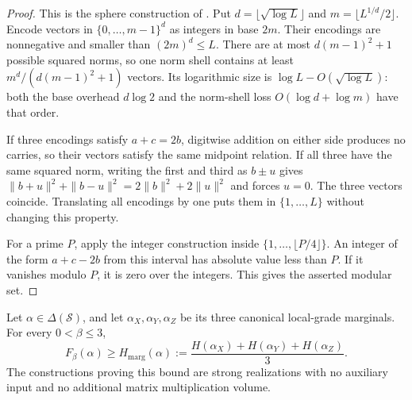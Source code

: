 \begin{proof}
This is the sphere construction of \citet{behrend}.  Put
$d=\lfloor\sqrt{\log L}\rfloor$ and
$m=\lfloor L^{1/d}/2\rfloor$.  Encode vectors in
$\{0,\ldots,m-1\}^d$ as integers in base $2m$.  Their encodings are
nonnegative and smaller than $(2m)^d\le L$.  There are at most
$d(m-1)^2+1$ possible squared norms, so one norm shell contains at least
$m^d/(d(m-1)^2+1)$ vectors.  Its logarithmic size is
$\log L-O(\sqrt{\log L})$: both the base overhead $d\log2$ and the
norm-shell loss $O(\log d+\log m)$ have that order.

If three encodings satisfy $a+c=2b$, digitwise addition on either side
produces no carries, so their vectors satisfy the same midpoint relation.
If all three have the same squared norm, writing the first and third as
$b\pm u$ gives $\|b+u\|^2+\|b-u\|^2=2\|b\|^2+2\|u\|^2$ and forces
$u=0$.  The three vectors coincide.  Translating all encodings by one puts
them in $\{1,\ldots,L\}$ without changing this property.

For a prime $P$, apply the integer construction inside
$\{1,\ldots,\lfloor P/4\rfloor\}$.  An integer of the form $a+c-2b$
from this interval has absolute value less than $P$.  If it vanishes modulo
$P$, it is zero over the integers.  This gives the asserted modular set.
\end{proof}

\begin{proposition}
\label{prop:matching}
Let $\alpha\in\Delta(\mathcal S)$, and let
$\alpha_X,\alpha_Y,\alpha_Z$ be its three canonical local-grade marginals.
For every $0<\beta\le3$,
\begin{equation}
 F_\beta(\alpha)\ge H_{\mathrm{marg}}(\alpha)
 :=\frac{H(\alpha_X)+H(\alpha_Y)+H(\alpha_Z)}3.
\label{val:matching-bound}
\end{equation}
The constructions proving this bound are strong realizations with no
auxiliary input and no additional matrix multiplication volume.
\end{proposition}

